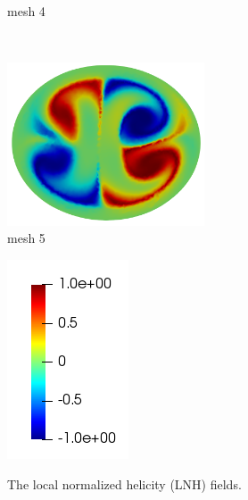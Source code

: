 \begin{figure}[htbp]
\begin{minipage}[c][2in][c]{0.4\linewidth}
        mesh 4
    \end{minipage}\\[.5\baselineskip]
    \begin{minipage}[c][2in][c]{0.4\linewidth}
        \centering
        \includegraphics[width=2.3in]{imgs/vena_cava/LNH_mesh5.png}\\
        mesh 5
    \end{minipage}
    \begin{minipage}[c][2in][c]{0.4\linewidth}
        \centering
        \includegraphics[width=.7in]{imgs/vena_cava/colormap_LNH.png}\\
    \end{minipage}
    \caption{The local normalized helicity (LNH) fields.}
    \label{fig:lnh}
\end{figure}


